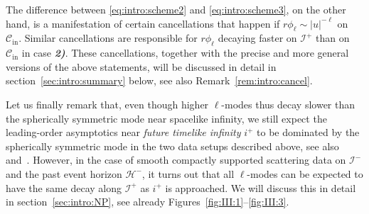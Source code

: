 \documentclass[11pt,english]{article}
\numberwithin{equation}{section}
\theoremstyle{remark}
\theoremstyle{plain}
\theoremstyle{remark}
\renewcommand{\(}{\left(}
\renewcommand{\)}{\right)}
\begin{document}


The difference between \eqref{eq:intro:scheme2} and \eqref{eq:intro:scheme3}, on the other hand, is a manifestation of certain cancellations that happen if $r\phi_\ell\sim |u|^{-\ell}$ on $\mathcal C_{\mathrm{in}}$. 
Similar cancellations are responsible for $r\phi_\ell$ decaying faster on $\mathcal I^+$ than on $\mathcal C_{\mathrm{in}}$ in case \textbf{\textit{2)}}.
These cancellations, together with the precise and more general versions of the above statements, will be discussed in detail in section~\ref{sec:intro:summary} below, see also Remark~\ref{rem:intro:cancel}. 


Let us finally remark that, even though higher $\ell$-modes thus decay slower than the spherically symmetric mode near spacelike infinity, we still expect the leading-order asymptotics near \textit{future timelike infinity} $i^+$ to be dominated by the spherically symmetric mode in the two data setups described above, see also~\cite{II} and~\cite{AAG21}. 
However, in the case of smooth compactly supported scattering data on $\mathcal I^-$ and the past event horizon $\mathcal H^-$, it turns out that all $\ell$-modes can be expected to have the same decay along $\mathcal I^+$ as $i^+$ is approached.
 We will discuss this in detail in section~\ref{sec:intro:NP}, see already Figures~\ref{fig:III:1}--\ref{fig:III:3}.
\end{document}
